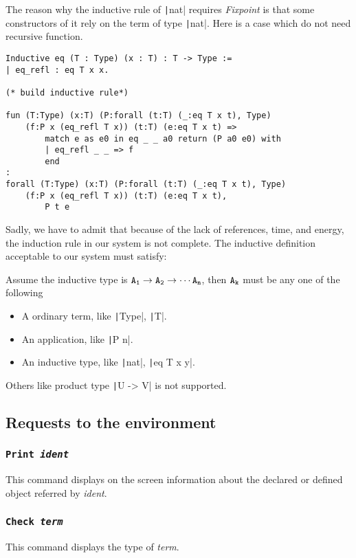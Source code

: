The reason why the inductive rule of \texttt|nat| requires {\it Fixpoint} is that some constructors of it
rely on the term of type \texttt|nat|. Here is a case which do not need recursive function.
\begin{center}
\begin{verbatim}
Inductive eq (T : Type) (x : T) : T -> Type :=
| eq_refl : eq T x x.

(* build inductive rule*)

fun (T:Type) (x:T) (P:forall (t:T) (_:eq T x t), Type) 
    (f:P x (eq_refl T x)) (t:T) (e:eq T x t) => 
        match e as e0 in eq _ _ a0 return (P a0 e0) with 
        | eq_refl _ _ => f
        end
: 
forall (T:Type) (x:T) (P:forall (t:T) (_:eq T x t), Type) 
    (f:P x (eq_refl T x)) (t:T) (e:eq T x t),
        P t e
\end{verbatim}
\end{center}
Sadly, we have to admit that because of the lack of references, time, and energy,
the induction rule in our system is not complete.
The inductive definition acceptable to our system must satisfy:\par
Assume the inductive type is $\tt A_1\to A_2\to \cdots A_n$, then $\tt A_k$ must be
any one of the following
\begin{itemize}
\item A ordinary term, like \texttt|Type|, \texttt|T|.
\item An application, like \texttt|P n|.
\item An inductive type, like \texttt|nat|, \texttt|eq T x y|.
\end{itemize}
Others like product type \texttt|U -> V| is not supported.

\subsection{Requests to the environment}
\subsubsection{\tt Print \sl ident}
This command displays on the screen information about the declared or defined object referred by {\sl ident}.
\subsubsection{\tt Check \sl term}
This command displays the type of {\sl term}.

